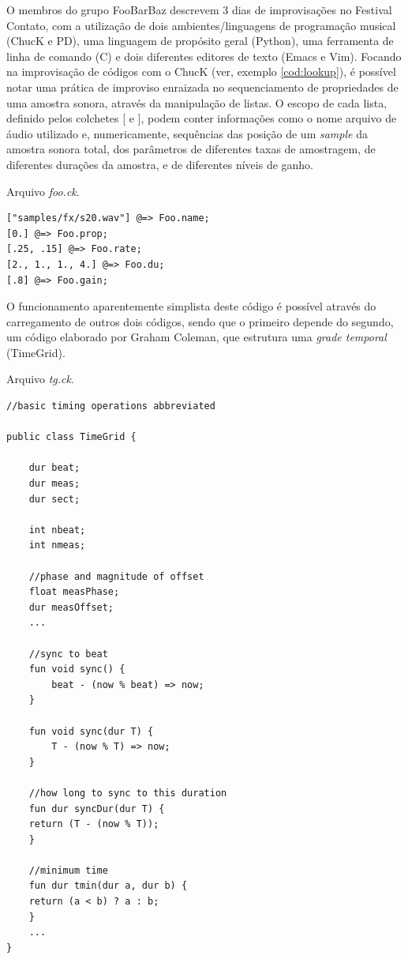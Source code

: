 O membros do grupo FooBarBaz descrevem 3 dias de improvisações no Festival Contato, com a utilização de dois ambientes/linguagens de programação musical (ChucK e PD), uma linguagem de propósito geral (Python), uma ferramenta de linha de comando (C) e dois diferentes editores de texto (Emacs e Vim). Focando na improvisação de códigos com o ChucK (ver, exemplo \ref{cod:lookup}), é possível notar uma prática de improviso enraizada no sequenciamento de propriedades de uma amostra sonora, através da manipulação de listas. O escopo de cada lista, definido pelos colchetes $[$ e $]$, podem conter informações como o nome arquivo de áudio utilizado e, numericamente, sequências das posição de um \emph{sample} da amostra sonora total, dos parâmetros de diferentes taxas de amostragem, de diferentes durações da amostra, e de diferentes níveis de ganho. 

\begin{example}{Arquivo \emph{foo.ck}.}\label{cod:lookup}
\begin{verbatim}
["samples/fx/s20.wav"] @=> Foo.name;
[0.] @=> Foo.prop;
[.25, .15] @=> Foo.rate;
[2., 1., 1., 4.] @=> Foo.du;
[.8] @=> Foo.gain;
\end{verbatim}
\end{example}

O funcionamento aparentemente simplista deste código é possível através do carregamento de outros dois códigos, sendo que o primeiro depende do segundo, um código elaborado por Graham Coleman, que estrutura uma \emph{grade temporal} (TimeGrid).

\begin{example}{Arquivo \emph{tg.ck}.}\label{cod:tg}
\begin{verbatim}
//basic timing operations abbreviated

public class TimeGrid {

    dur beat;
    dur meas;
    dur sect;

    int nbeat;
    int nmeas;

    //phase and magnitude of offset
    float measPhase;
    dur measOffset;
    ...

    //sync to beat
    fun void sync() {
        beat - (now % beat) => now;
    }

    fun void sync(dur T) {
        T - (now % T) => now;
    }

    //how long to sync to this duration
    fun dur syncDur(dur T) {
	return (T - (now % T));
    }

    //minimum time
    fun dur tmin(dur a, dur b) {
	return (a < b) ? a : b;
    }
    ...
}
\end{verbatim}  
\end{example}

